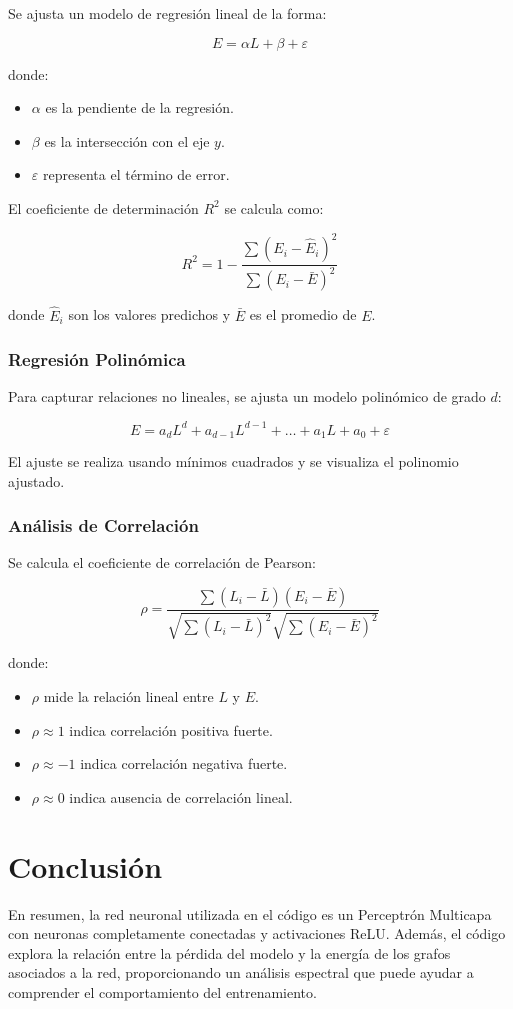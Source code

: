 \documentclass{article}
\begin{document}
Se ajusta un modelo de regresión lineal de la forma:

\[
E = \alpha L + \beta + \varepsilon
\]

donde:

\begin{itemize}
    \item \( \alpha \) es la pendiente de la regresión.
    \item \( \beta \) es la intersección con el eje \( y \).
    \item \( \varepsilon \) representa el término de error.
\end{itemize}

El coeficiente de determinación \( R^2 \) se calcula como:

\[
R^2 = 1 - \frac{\sum (E_i - \hat{E}_i)^2}{\sum (E_i - \bar{E})^2}
\]

donde \( \hat{E}_i \) son los valores predichos y \( \bar{E} \) es el promedio de \( E \).

\subsubsection{Regresión Polinómica}

Para capturar relaciones no lineales, se ajusta un modelo polinómico de grado \( d \):

\[
E = a_d L^d + a_{d-1} L^{d-1} + \dots + a_1 L + a_0 + \varepsilon
\]

El ajuste se realiza usando mínimos cuadrados y se visualiza el polinomio ajustado.

\subsubsection{Análisis de Correlación}

Se calcula el coeficiente de correlación de Pearson:

\[
\rho = \frac{\sum (L_i - \bar{L}) (E_i - \bar{E})}{\sqrt{\sum (L_i - \bar{L})^2} \sqrt{\sum (E_i - \bar{E})^2}}
\]

donde:

\begin{itemize}
    \item \( \rho \) mide la relación lineal entre \( L \) y \( E \).
    \item \( \rho \approx 1 \) indica correlación positiva fuerte.
    \item \( \rho \approx -1 \) indica correlación negativa fuerte.
    \item \( \rho \approx 0 \) indica ausencia de correlación lineal.
\end{itemize}

\section{Conclusión}

En resumen, la red neuronal utilizada en el código es un Perceptrón Multicapa con neuronas completamente conectadas y activaciones ReLU. Además, el código explora la relación entre la pérdida del modelo y la energía de los grafos asociados a la red, proporcionando un análisis espectral que puede ayudar a comprender el comportamiento del entrenamiento.
\end{document}
